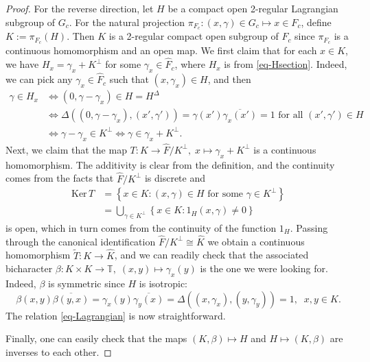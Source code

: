 \documentclass[12pt,reqno]{amsart}
\theoremstyle{definition}
\theoremstyle{definition}
\theoremstyle{definition}
\numberwithin{thm}{section}
\numberwithin{equation}{section}
\newcommand{\set}[1]{\left\{#1\right\}}
\newcommand{\tor}{\mathbb{T}}
\newcommand{\wh}[1]{\widehat{#1}}
\begin{document}
\begin{proof}
For the reverse direction, let $H$ be a compact open 2-regular Lagrangian subgroup of $G_c$. For the natural projection $\pi_{F_c}:(x,\gamma)\in G_c\mapsto x\in F_c$, define $K:=\pi_{F_c}(H)$. Then $K$ is a 2-regular compact open subgroup of $F_c$ since $\pi_{F_c}$ is a continuous homomorphism and an open map. We first claim that for each $x\in K$, we have $H_x = \gamma_x + K^\perp$ for some $\gamma_x\in \widehat{F}_c$, where $H_x$ is from \eqref{eq-Hsection}. Indeed, we can pick any $\gamma_x\in \wh{F}_c$ such that $(x,\gamma_x)\in H$, and then
\begin{align*}
    \gamma\in H_x &\Longleftrightarrow (0, \gamma-{\gamma_x})\in H=H^{\Delta}\\
    &\Longleftrightarrow \Delta((0,\gamma-{\gamma_x}),(x',\gamma'))=\gamma(x')\overline{\gamma_x(x')}=1 \text{ for all } (x',\gamma')\in H\\
    &\Longleftrightarrow \gamma-{\gamma_x}\in K^{\perp} \Longleftrightarrow \gamma\in \gamma_x+ K^{\perp}.
\end{align*}
Next, we claim that the map $T: K \to \widehat{F}/K^{\perp},\; x \mapsto \gamma_x + K^\perp$ is a continuous homomorphism. The additivity is clear from the definition, and the continuity comes from the facts that $\widehat{F}/K^{\perp}$ is discrete and 
\begin{align*}
    \text{Ker}\, T &=\set{x\in K: (x,\gamma)\in H \text{ for some } \gamma\in K^{\perp}}\\
    &=\bigcup_{\gamma\in K^{\perp}}\set{x\in K:1_H(x,\gamma)\neq 0}
\end{align*}
is open, which in turn comes from the continuity of the function $1_H$. Passing through the canonical identification $\widehat{F}/K^{\perp}\cong \widehat{K}$ we obtain a continuous homomorphism $\tilde{T}: K \to \wh{K}$, and we can readily check that the associated bicharacter $\beta:K\times K\to \tor,\; (x,y)\mapsto \gamma_x(y)$ is the one we were looking for. Indeed, $\beta$ is symmetric since $H$ is isotropic:
    $$\beta(x,y)\overline{\beta(y,x)}=\gamma_x(y)\overline{\gamma_y(x)}=\Delta((x,\gamma_x),(y,\gamma_y))=1,\;\; x,y\in K.$$
The relation \eqref{eq-Lagrangian} is now straightforward.

Finally, one can easily check that the maps $(K,\beta)\mapsto H$ and $H \mapsto (K,\beta)$ are inverses to each other.
\end{proof}
\end{document}
